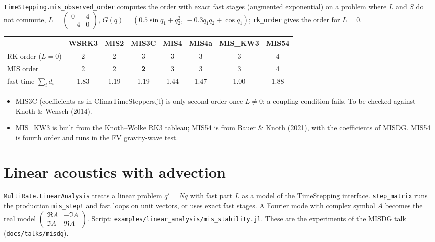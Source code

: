 \documentclass[11pt,a4paper]{article}
\newcommand{\code}[1]{\texttt{#1}}
\begin{document}
\code{TimeStepping.mis\_observed\_order} computes the order with exact fast stages (augmented
exponential) on a problem where $L$ and $S$ do not commute,
$L = \begin{pmatrix}0&4\\-4&0\end{pmatrix}$,
$G(q) = (0.5\sin q_1 + q_2^2,\ -0.3q_1q_2 + \cos q_1)$; \code{rk\_order} gives the order for $L = 0$.

\begin{center}
\begin{tabular}{lccccccc}
\toprule
 & WSRK3 & MIS2 & MIS3C & MIS4 & MIS4a & MIS\_KW3 & MIS54\\
\midrule
RK order ($L = 0$) & 2 & 2 & 3 & 3 & 3 & 3 & 4\\
MIS order & 2 & 2 & \textbf{2} & 3 & 3 & 3 & 4\\
fast time $\sum_i d_i$ & 1.83 & 1.19 & 1.19 & 1.44 & 1.47 & 1.00 & 1.88\\
\bottomrule
\end{tabular}
\end{center}

\begin{itemize}
\item MIS3C (coefficients as in ClimaTimeSteppers.jl) is only second order once $L\ne0$: a
  coupling condition fails. To be checked against Knoth \& Wensch (2014).
\item MIS\_KW3 is built from the Knoth--Wolke RK3 tableau; MIS54 is from Bauer \& Knoth (2021), with
  the coefficients of MISDG. MIS54 is fourth order and runs in the FV gravity-wave test.
\end{itemize}

\section{Linear acoustics with advection}

\code{MultiRate.LinearAnalysis} treats a linear problem $q' = Nq$ with fast part $L$ as a model of
the TimeStepping interface. \code{step\_matrix} runs the production \code{mis\_step!} and fast loops
on unit vectors, or uses exact fast stages. A Fourier mode with complex symbol $A$ becomes the real
model $\begin{pmatrix}\Re A&-\Im A\\ \Im A&\Re A\end{pmatrix}$. Script:
\code{examples/linear\_analysis/mis\_stability.jl}. These are the experiments of the MISDG talk
(\code{docs/talks/misdg}).
\end{document}
